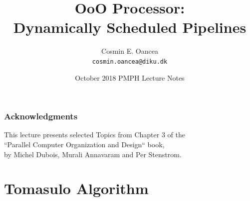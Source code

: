 \documentclass{beamer}
\title[OoO Processor]{OoO Processor:\\Dynamically Scheduled Pipelines}
\author[C.~Oancea]{Cosmin E. Oancea\\{\tt cosmin.oancea@diku.dk}}
\institute{Department of Computer Science (DIKU)\\University of Copenhagen}
\date[Oct 2018]{October 2018 PMPH Lecture Notes}
\begin{document}
\titleslide



\begin{frame}
\frametitle{Acknowledgments}
This lecture presents selected Topics from Chapter 3 of the\\
``Parallel Computer Organization and Design`` book,\\
by Michel Dubois, Murali Annavaram and Per Stenstrom.
\end{frame}

\begin{frame}[fragile]
	\tableofcontents
\end{frame}

\section{Tomasulo Algorithm}
\end{document}
